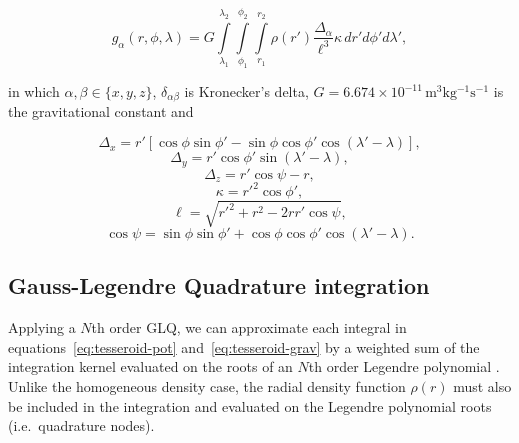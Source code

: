 \documentclass[extra, referee]{gji}
\begin{document}
\begin{equation}
    g_{\alpha}(r,\phi,\lambda) = G
    \int\limits_{\lambda_1}^{\lambda_2}
    \int\limits_{\phi_1}^{\phi_2}
    \int\limits_{r_1}^{r_2}
    \rho(r') \frac{\Delta_\alpha}{\ell^3}
    \kappa \, dr' d\phi' d\lambda',
\label{eq:tesseroid-grav}
\end{equation}

\noindent in which $\alpha, \beta \in \{x, y, z\}$, $\delta_{\alpha\beta}$ is
Kronecker's delta, $G = 6.674\times10^{-11}\, \text{m$^3$kg$^{-1}$s$^{-1}$}$ is the
gravitational constant and

\begin{equation}
    \Delta_x = r'[\cos\phi\sin\phi' - \sin\phi\cos\phi'
               \cos(\lambda' - \lambda)],
\end{equation}
\begin{equation}
    \Delta_y = r' \cos \phi' \sin(\lambda' - \lambda),
\end{equation}
\begin{equation}
    \Delta_z = r' \cos \psi - r,
\end{equation}
\begin{equation}
    \kappa = {r'}^2 \cos \phi',
\end{equation}
\begin{equation}
    \ell = \sqrt{{r'}^2 + r^2 - 2 r r' \cos \psi},
\label{eq:ell}
\end{equation}
\begin{equation}
    \cos\psi = \sin\phi\sin\phi' + \cos\phi\cos\phi'
                 \cos(\lambda' - \lambda).
\label{eq:cospsi}
\end{equation}

\subsection{Gauss-Legendre Quadrature integration}

Applying a $N$th order GLQ, we can approximate each integral in
equations~\ref{eq:tesseroid-pot} and~\ref{eq:tesseroid-grav} by a weighted sum of the
integration kernel evaluated on the roots of an $N$th order Legendre polynomial
\citep[p.~390]{Hildebrand1987}.
Unlike the homogeneous density case, the radial density function $\rho(r)$ must also be
included in the integration and evaluated on the Legendre polynomial roots
(i.e.~quadrature nodes).
\end{document}
